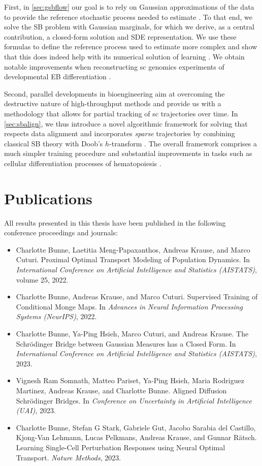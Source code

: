 First, in \cref{sec:gsbflow} our goal is to rely on Gaussian approximations of the data to provide the reference stochastic process needed to estimate . To that end, we solve the \acrlong{SB} problem with Gaussian marginals, for which we derive, as a central contribution, a closed-form solution and \acrshort{SDE} representation. We use these formulas to define the reference process used to estimate more complex  and show that this does indeed help with its numerical solution of learning . We obtain notable improvements when reconstructing \acrlong{sc} genomics experiments of developmental \acrfull{EB} differentiation \citep{bunne2022recovering}.

Second, parallel developments in bioengineering aim at overcoming the destructive nature of high-throughput methods and provide us with a methodology that allows for partial tracking of \acrlong{sc} trajectories over time.
In \cref{sec:sbalign}, we thus introduce a novel algorithmic framework for solving  that respects data alignment and incorporates \emph{sparse} trajectories by combining classical \acrlong{SB} theory with Doob's 
$h$-transform \citep{somnath2023aligned}. The overall framework comprises a much simpler training procedure and substantial improvements in tasks such as cellular differentiation processes of hematopoiesis \citep{weinreb2020lineage}.


\section{Publications}
All results presented in this thesis have been published in the following conference proceedings and journals:

\begin{itemize}
	\item[] Charlotte Bunne, Laetitia Meng-Papaxanthos, Andreas Krause, and Marco Cuturi. Proximal Optimal Transport Modeling of Population Dynamics. In \textit{International Conference on Artificial Intelligence and Statistics (AISTATS)}, volume 25, 2022.
	\item[] Charlotte Bunne, Andreas Krause, and Marco Cuturi. Supervised Training of Conditional Monge Maps. In \textit{Advances in Neural Information Processing Systems (NeurIPS)}, 2022.
	\item[] Charlotte Bunne, Ya-Ping Hsieh, Marco Cuturi, and Andreas Krause. The Schr{\"o}dinger Bridge between Gaussian Measures has a Closed Form. In \textit{International Conference on Artificial Intelligence and Statistics (AISTATS)}, 2023.
	\item[] Vignesh Ram Somnath, Matteo Pariset, Ya-Ping Hsieh, Maria Rodriguez Martinez, Andreas Krause, and Charlotte Bunne. Aligned Diffusion Schr{\"o}dinger Bridges. In \textit{Conference on Uncertainty in Artificial Intelligence (UAI)}, 2023.
	\item[] Charlotte Bunne, Stefan G Stark, Gabriele Gut, Jacobo Sarabia del Castillo, Kjong-Van Lehmann, Lucas Pelkmans, Andreas Krause, and Gunnar R{\"a}tsch. Learning Single-Cell Perturbation Responses using Neural Optimal Transport. \textit{Nature Methods}, 2023.
\end{itemize}


